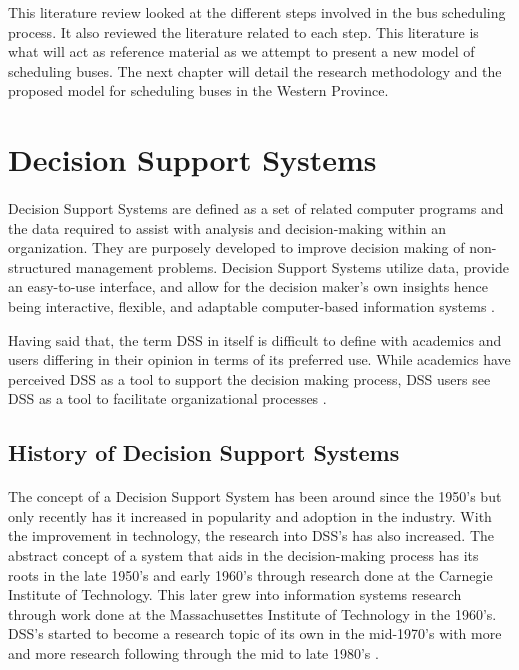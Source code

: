 \documentclass[12pt, oneside]{report}
\begin{document}
This literature review looked at the different steps involved in the bus scheduling process. It also reviewed the literature related to each step. This literature is what will act as reference material as we attempt to present a new model of scheduling buses. The next chapter will detail the research methodology and the proposed model for scheduling buses in the Western Province.

\newpage

\section{Decision Support Systems}
\label {section-DSS}

\paragraph{ } Decision Support Systems are defined as a set of related computer programs and the data required to assist with analysis and decision-making within an organization. They are purposely developed to improve decision making of non-structured management problems. Decision Support Systems utilize data, provide an easy-to-use interface, and allow for the decision maker’s own insights hence being interactive, flexible, and adaptable computer-based information systems \citep{Turban2005}. 

Having said that, the term DSS in itself is difficult to define with academics and users differing in their opinion in terms of its preferred use. While academics have perceived DSS as a tool to support the decision making process, DSS users see DSS as a tool to facilitate organizational processes \citep{Keen1980}.

\subsection{History of Decision Support Systems}

\paragraph{ } The concept of a Decision Support System has been around since the 1950's but only recently has it increased in popularity and adoption in the industry. With the improvement in technology, the research into DSS's has also increased. The abstract concept of a system that aids in the decision-making process has its roots in the late 1950's and early 1960's through research done at the Carnegie Institute of Technology. This later grew into information systems research through work done at the Massachusettes Institute of Technology in the 1960's. DSS's started to become a research topic of its own in the mid-1970's with more and more research following through the mid to late 1980's \citep{Keen1980, Power2003}.
\end{document}

